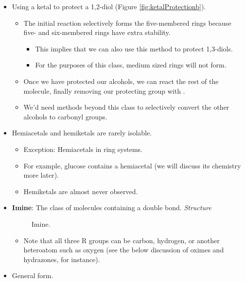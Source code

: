 \documentclass[../notes.tex]{subfiles}
\begin{document}
\begin{itemize}
\begin{itemize}
\begin{itemize}
        \end{itemize}
    \end{itemize}
    \item Using a ketal to protect a 1,2-diol (Figure \ref{fig:ketalProtectionb}).
    \begin{itemize}
        \item The initial reaction selectively forms the five-membered rings because five- and six-membered rings have extra stability.
        \begin{itemize}
            \item This implies that we can also use this method to protect 1,3-diols.
            \item For the purposes of this class, medium sized rings will not form.
        \end{itemize}
        \item Once we have protected our alcohols, we can react the rest of the molecule, finally removing our protecting group with .
        \item We'd need methods beyond this class to selectively convert the other alcohols to carbonyl groups.
    \end{itemize}
    \item Hemiacetals and hemiketals are rarely isolable.
    \begin{itemize}
        \item Exception: Hemiacetals in ring systems.
        \item For example, glucose contains a hemiacetal (we will discuss its chemistry more later).
        \item Hemiketals are almost never observed.
    \end{itemize}
    \item \textbf{Imine}: The class of molecules containing a  double bond. \emph{Structure}
    \begin{figure}[h!]
        \centering
        \footnotesize
        \caption{Imine.}
        \label{fig:imine}
    \end{figure}
    \begin{itemize}
        \item Note that all three R groups can be carbon, hydrogen, or another heteroatom such as oxygen (see the below discussion of oximes and hydrazones, for instance).
    \end{itemize}
    \item General form.
    \begin{center}

\end{center}
\end{itemize}
\end{document}
